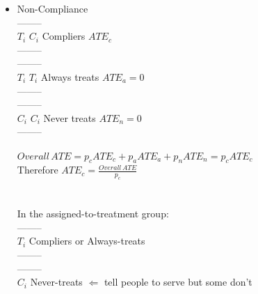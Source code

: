 \begin{itemize}
    \item Non-Compliance\\
    \hspace*{0.4cm}  --------\\
    \hspace*{0.5cm}$T_i$ \textbar $C_i$ \hspace{3cm} Compliers \hspace{3cm} $ATE_c$\\
    \hspace*{0.4cm}  --------\\
    \hspace*{0.4cm}  --------\\
    \hspace*{0.5cm}$T_i$ \textbar $T_i$ \hspace{3cm} Always treats \hspace{2.5cm} $ATE_a = 0$\\
    \hspace*{0.4cm}  --------\\
    \hspace*{0.4cm}  --------\\
    \hspace*{0.5cm}$C_i$ \textbar $C_i$ \hspace{3cm} Never treats \hspace{2.5cm} $ATE_n = 0$\\
    \hspace*{0.4cm}  --------\\
     \\
    $Overall\, ATE = p_c ATE_c + p_a ATE_a + p_n ATE_n = p_c ATE_c$\\
    Therefore $ATE_c = \frac{Overall\, ATE}{p_c}$\\
     \\
     \\
    In the assigned-to-treatment group:\\
    \hspace*{0.4cm}  --------\\
    \hspace*{0.5cm}$T_i$ \textbar \textbar \textbar \textbar \hspace{1cm} Compliers or Always-treats\\
    \hspace*{0.4cm}  --------\\    
    \hspace*{0.4cm}  --------\\
    \hspace*{0.4cm} \textbar \textbar \textbar \textbar \textbar $C_i$ \hspace{0.9cm} Never-treats $\Longleftarrow$ tell people to serve but some don't\\

\end{itemize}
